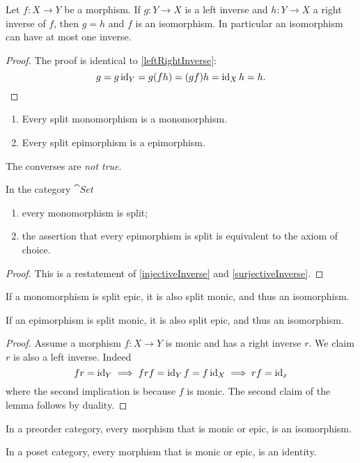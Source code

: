 \begin{lemma}
Let $f:X\to Y$ be a morphism. If $g: Y\to X$ is a left inverse and $h: Y\to X$ a right inverse of $f$, then $g=h$ and $f$ is an isomorphism. In particular an isomorphism can have at most one inverse.
\end{lemma}
\begin{proof}
The proof is identical to \ref{leftRightInverse}:
\[ g = g\operatorname{id}_Y = g(fh) = (gf)h = \operatorname{id}_Xh = h. \]
\end{proof}

\begin{lemma}\mbox{}
\begin{enumerate}
\item Every split monomorphism is a monomorphism.
\item Every split epimorphism is a epimorphism.
\end{enumerate}
\end{lemma}
The converses are \emph{not true}.

\begin{lemma}
In the category $\cat{Set}$
\begin{enumerate}
\item every monomorphism is split;
\item the assertion that every epimorphism is split is equivalent to the axiom of choice.
\end{enumerate}
\end{lemma}
\begin{proof}
This is a restatement of \ref{injectiveInverse} and \ref{surjectiveInverse}.
\end{proof}

\begin{lemma} \label{singleSplitImpliesDoubleSplit}
If a monomorphism is split epic, it is also split monic, and thus an isomorphism.

If an epimorphism is split monic, it is also split epic, and thus an isomorphism.
\end{lemma}
\begin{proof}
Assume a morphism $f:X\to Y$ is monic and has a right inverse $r$. We claim $r$ is also a left inverse. Indeed
\[ fr = \operatorname{id}_Y \implies frf = \operatorname{id}_Yf = f\operatorname{id}_X \implies rf = \operatorname{id}_x  \]
where the second implication is because $f$ is monic. The second claim of the lemma follows by duality.
\end{proof}


\begin{lemma}
In a preorder category, every morphism that is monic or epic, is an isomorphism.

In a poset category, every morphism that is monic or epic, is an identity.
\end{lemma}

